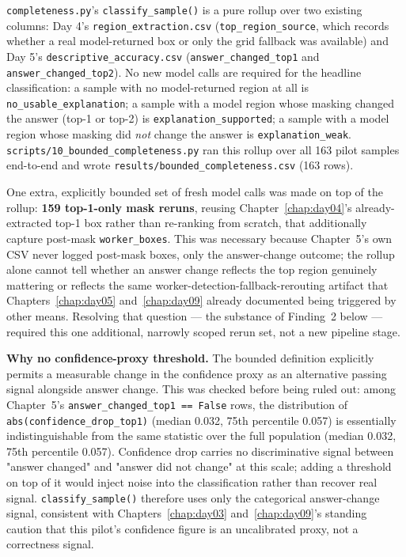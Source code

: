 \texttt{completeness.py}'s \texttt{classify\_sample()} is a pure rollup over two existing columns: Day
4's \texttt{region\_extraction.csv} (\texttt{top\_region\_source}, which records whether a real
model-returned box or only the grid fallback was available) and Day 5's
\texttt{descriptive\_accuracy.csv} (\texttt{answer\_changed\_top1} and \texttt{answer\_changed\_top2}).
No new model calls are required for the headline classification: a sample with no model-returned region
at all is \texttt{no\_usable\_explanation}; a sample with a model region whose masking changed the
answer (top-1 or top-2) is \texttt{explanation\_supported}; a sample with a model region whose masking
did \emph{not} change the answer is \texttt{explanation\_weak}. \texttt{scripts/10\_bounded\_completeness.py}
ran this rollup over all 163 pilot samples end-to-end and wrote \texttt{results/bounded\_completeness.csv}
(163 rows).

One extra, explicitly bounded set of fresh model calls was made on top of the rollup: \textbf{159
top-1-only mask reruns}, reusing Chapter~\ref{chap:day04}'s already-extracted top-1 box rather than
re-ranking from scratch, that additionally capture post-mask \texttt{worker\_boxes}. This was necessary
because Chapter~5's own CSV never logged post-mask boxes, only the answer-change outcome; the rollup
alone cannot tell whether an answer change reflects the top region genuinely mattering or reflects the
same worker-detection-fallback-rerouting artifact that Chapters~\ref{chap:day05} and~\ref{chap:day09}
already documented being triggered by other means. Resolving that question --- the substance of
Finding~2 below --- required this one additional, narrowly scoped rerun set, not a new pipeline stage.

\textbf{Why no confidence-proxy threshold.} The bounded definition explicitly permits a measurable
change in the confidence proxy as an alternative passing signal alongside answer change. This was
checked before being ruled out: among Chapter~5's \texttt{answer\_changed\_top1 == False} rows, the
distribution of \texttt{abs(confidence\_drop\_top1)} (median 0.032, 75th percentile 0.057) is
essentially indistinguishable from the same statistic over the full population (median 0.032, 75th
percentile 0.057). Confidence drop carries no discriminative signal between "answer changed" and
"answer did not change" at this scale; adding a threshold on top of it would inject noise into the
classification rather than recover real signal. \texttt{classify\_sample()} therefore uses only the
categorical answer-change signal, consistent with Chapters~\ref{chap:day03} and~\ref{chap:day09}'s
standing caution that this pilot's confidence figure is an uncalibrated proxy, not a correctness signal.

